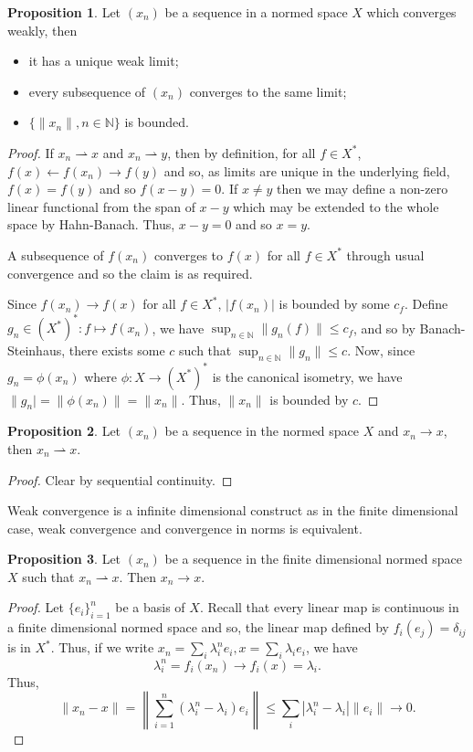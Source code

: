 \documentclass[]{article}
\theoremstyle{definition}
\theoremstyle{definition}
\newtheorem{proposition}{Proposition}[section]
\newcommand{\weak}{\rightharpoonup}
\begin{document}
\begin{proposition}
  Let \((x_n)\) be a sequence in a normed space \(X\) which converges weakly, 
  then 
  \begin{itemize}
    \item it has a unique weak limit;
    \item every subsequence of \((x_n)\) converges to the same limit;
    \item \(\{\|x_n\|, n \in \mathbb{N}\}\) is bounded.
  \end{itemize}
\end{proposition}
\begin{proof}
  If \(x_n \weak x\) and \(x_n \weak y\), then by definition, for all 
  \(f \in X^*\), \(f(x) \leftarrow f(x_n) \to f(y)\) and so, as limits are 
  unique in the underlying field, \(f(x) = f(y)\) and so \(f(x - y) = 0\).
  If \(x \neq y\) then we may define a non-zero linear functional from the 
  span of \(x - y\) which may be extended to the whole space by Hahn-Banach. 
  Thus, \(x - y = 0\) and so \(x = y\).

  A subsequence of \(f(x_n)\) converges to \(f(x)\) for all \(f \in X^*\) through 
  usual convergence and so the claim is as required.

  Since \(f(x_n) \to f(x)\) for all \(f \in X^*\), \(|f(x_n)|\) is bounded by 
  some \(c_f\). Define \(g_n \in (X^*)^* : f \mapsto f(x_n)\), we have 
  \(\sup_{n \in \mathbb{N}} \|g_n(f)\| \le c_f\), and so by Banach-Steinhaus, 
  there exists some \(c\) such that \(\sup_{n \in \mathbb{N}} \|g_n\| \le c\).
  Now, since \(g_n = \phi(x_n)\) where \(\phi : X \to (X^*)^*\) is the canonical 
  isometry, we have \(\|g_n| = \|\phi(x_n)\| = \|x_n\|\). Thus, \(\|x_n\|\) is 
  bounded by \(c\). 
\end{proof}

\begin{proposition}
  Let \((x_n)\) be a sequence in the normed space \(X\) and \(x_n \to x\), 
  then \(x_n \weak x\).
\end{proposition}
\begin{proof}
  Clear by sequential continuity.
\end{proof}

Weak convergence is a infinite dimensional construct as in the finite dimensional 
case, weak convergence and convergence in norms is equivalent.

\begin{proposition}
  Let \((x_n)\) be a sequence in the finite dimensional normed space \(X\) 
  such that \(x_n \weak x\). Then \(x_n \to x\).
\end{proposition}
\begin{proof}
  Let \(\{e_i\}_{i = 1}^n\) be a basis of \(X\). Recall that every linear map 
  is continuous in a finite dimensional normed space and so, the linear map 
  defined by \(f_i(e_j) = \delta_{ij}\) is in \(X^*\). Thus, if we write 
  \(x_n = \sum_i \lambda_i^n e_i, x = \sum_i \lambda_i e_i\), we have 
  \[\lambda_i^n = f_i(x_n) \to f_i(x) = \lambda_i.\]
  Thus, 
  \[\|x_n - x\| = \left\|\sum_{i = 1}^n (\lambda_i^n - \lambda_i)e_i \right\| 
  \le \sum_i |\lambda_i^n - \lambda_i| \|e_i\| \to 0.\] 
\end{proof}
\end{document}
